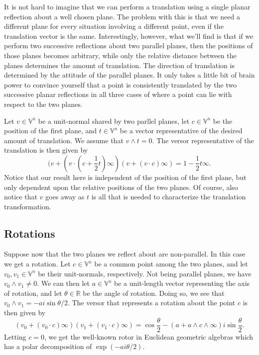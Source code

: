 \documentclass[12pt]{article}
\newcommand{\V}{\mathbb{V}}
\newcommand{\R}{\mathbb{R}}
\newcommand{\nvai}{\infty}
\begin{document}
It is not hard to imagine that we can perform a translation
using a single planar reflection about a well chosen plane.
The problem with this is that we need a different plane for
every situation involving a different point, even if the translation
vector is the same.  Interestingly, however, what we'll find is that
if we perform two successive reflections about two parallel planes, then
the positions of those planes becomes arbitrary, while only the relative
distance between the planes determines the amount of translation.
The direction of translation is determined by the attitude of the parallel planes.
It only takes a little bit of brain power to convince yourself that a point is consistently
translated by the two successive planar reflections in all three cases of where
a point can lie with respect to the two planes.

Let $v\in\V^n$ be a unit-normal shared by two parllel planes, let
$c\in\V^n$ be the position of the first plane, and $t\in\V^n$
be a vector representative of the desired amount of translation.
We assume that $v\wedge t=0$.
The versor representative of the translation is then given by
\begin{equation*}
(v+(v\cdot(c+\frac{1}{2}t)\nvai)(v+(v\cdot c)\nvai) = 1 - \frac{1}{2}t\nvai.
\end{equation*}
Notice that our result here is independent of the position of the
first plane, but only dependent upon the relative positions of
the two planes.
Of course, also notice that $v$ goes away as $t$ is all that
is needed to characterize the translation transformation.


\subsection{Rotations}

Suppose now that the two planes we reflect about are
non-parallel.  In this case we get a rotation.  Let $c\in\V^n$
be a common point among the two planes, and let $v_0,v_1\in\V^n$
be their unit-normals, respectively.  Not being parallel planes,
we have $v_0\wedge v_1\neq 0$.  We can then let $a\in\V^n$
be a unit-length vector representing the axis of rotation, and
let $\theta\in\R$ be the angle of rotation.  Doing so, we see
that $v_0\wedge v_1=-ai\sin\theta/2$.  The versor that
represents a rotation about the point $c$ is then given by
\begin{equation*}
(v_0+(v_0\cdot c)\nvai)(v_1+(v_1\cdot c)\nvai) = \cos\frac{\theta}{2} - (a+a\wedge c\wedge\nvai)i\sin\frac{\theta}{2}.
\end{equation*}
Letting $c=0$, we get the well-known rotor in Euclidean geometric algebras which
has a polar decomposition of $\exp(-ai\theta/2)$.
\end{document}
